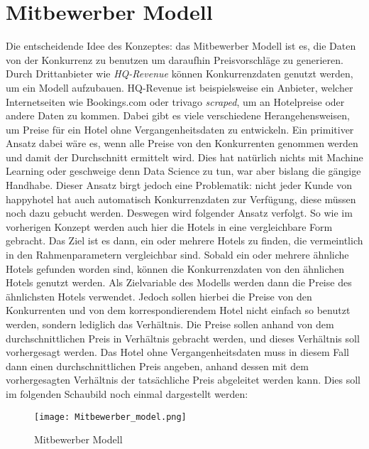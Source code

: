 \section{Mitbewerber Modell}
\label{sec:Mitbewerber}
Die entscheidende Idee des Konzeptes: das Mitbewerber Modell ist es, die Daten von der Konkurrenz zu benutzen um daraufhin Preisvorschläge zu generieren. 
\newline
\newline
Durch Drittanbieter wie \emph{HQ-Revenue} können Konkurrenzdaten genutzt werden, um ein Modell aufzubauen. HQ-Revenue ist beispielsweise ein Anbieter, welcher Internetseiten wie Bookings.com oder trivago \emph{scraped}, um an Hotelpreise oder andere Daten zu kommen. Dabei gibt es viele verschiedene Herangehensweisen, um Preise für ein Hotel ohne Vergangenheitsdaten zu entwickeln. Ein primitiver Ansatz dabei wäre es, wenn alle Preise von den Konkurrenten genommen werden und damit der Durchschnitt ermittelt wird. Dies hat natürlich nichts mit Machine Learning oder geschweige denn Data Science zu tun, war aber bislang die gängige Handhabe.
\newline
\newline
Dieser Ansatz birgt jedoch eine Problematik: nicht jeder Kunde von happyhotel hat auch automatisch Konkurrenzdaten zur Verfügung, diese müssen noch dazu gebucht werden. Deswegen wird folgender Ansatz verfolgt. 
\newline
\newline
So wie im vorherigen Konzept \emph{} werden auch hier die Hotels in eine vergleichbare Form gebracht. Das Ziel ist es dann, ein oder mehrere Hotels zu finden, die vermeintlich in den Rahmenparametern vergleichbar sind. Sobald ein oder mehrere ähnliche Hotels gefunden worden sind, können die Konkurrenzdaten von den ähnlichen Hotels genutzt werden. 
\newline
\newline
Als Zielvariable des Modells werden dann die Preise des ähnlichsten Hotels verwendet. Jedoch sollen hierbei die Preise von den Konkurrenten und von dem korrespondierendem Hotel nicht einfach so benutzt werden, sondern lediglich das Verhältnis. Die Preise sollen anhand von dem durchschnittlichen Preis in Verhältnis gebracht werden, und dieses Verhältnis soll vorhergesagt werden. 
\newline
\newline 
Das Hotel ohne Vergangenheitsdaten muss in diesem Fall dann einen durchschnittlichen Preis angeben, anhand dessen mit dem vorhergesagten Verhältnis der tatsächliche Preis abgeleitet werden kann. Dies soll im folgenden Schaubild noch einmal dargestellt werden:
\newpage
\begin{figure}[h]
    \centering
    \texttt{[image: Mitbewerber\_model.png]}
    \caption[Mitbewerber Modell]{Mitbewerber Modell}
    \label{img:all_hotels}
\end{figure}
